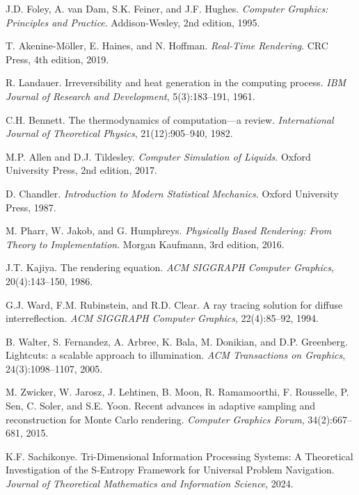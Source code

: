 \documentclass[12pt,a4paper]{article}
\begin{document}

\begin{thebibliography}{99}

J.D. Foley, A. van Dam, S.K. Feiner, and J.F. Hughes.
\textit{Computer Graphics: Principles and Practice}.
Addison-Wesley, 2nd edition, 1995.

T. Akenine-Möller, E. Haines, and N. Hoffman.
\textit{Real-Time Rendering}.
CRC Press, 4th edition, 2019.

R. Landauer.
Irreversibility and heat generation in the computing process.
\textit{IBM Journal of Research and Development}, 5(3):183--191, 1961.

C.H. Bennett.
The thermodynamics of computation---a review.
\textit{International Journal of Theoretical Physics}, 21(12):905--940, 1982.

M.P. Allen and D.J. Tildesley.
\textit{Computer Simulation of Liquids}.
Oxford University Press, 2nd edition, 2017.

D. Chandler.
\textit{Introduction to Modern Statistical Mechanics}.
Oxford University Press, 1987.

M. Pharr, W. Jakob, and G. Humphreys.
\textit{Physically Based Rendering: From Theory to Implementation}.
Morgan Kaufmann, 3rd edition, 2016.

J.T. Kajiya.
The rendering equation.
\textit{ACM SIGGRAPH Computer Graphics}, 20(4):143--150, 1986.

G.J. Ward, F.M. Rubinstein, and R.D. Clear.
A ray tracing solution for diffuse interreflection.
\textit{ACM SIGGRAPH Computer Graphics}, 22(4):85--92, 1994.

B. Walter, S. Fernandez, A. Arbree, K. Bala, M. Donikian, and D.P. Greenberg.
Lightcuts: a scalable approach to illumination.
\textit{ACM Transactions on Graphics}, 24(3):1098--1107, 2005.

M. Zwicker, W. Jarosz, J. Lehtinen, B. Moon, R. Ramamoorthi, F. Rousselle, P. Sen, C. Soler, and S.E. Yoon.
Recent advances in adaptive sampling and reconstruction for Monte Carlo rendering.
\textit{Computer Graphics Forum}, 34(2):667--681, 2015.

K.F. Sachikonye.
Tri-Dimensional Information Processing Systems: A Theoretical Investigation of the S-Entropy Framework for Universal Problem Navigation.
\textit{Journal of Theoretical Mathematics and Information Science}, 2024.

\end{thebibliography}
\end{document}
